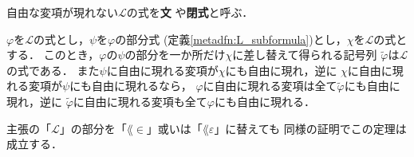 	\begin{screen}
		\begin{metadfn}[文]
			自由な変項が現れない$\mathcal{L}$の式を{\bf 文}
			や{\bf 閉式}と呼ぶ．
		\end{metadfn}
	\end{screen}
	
	\begin{screen}
		\begin{metathm}[部分式を取り替えても式]
		\label{metathm:replace_subformula_with_some_formula}
			$\varphi$を$\mathcal{L}$の式とし，$\psi$を$\varphi$の部分式
			(定義\ref{metadfn:L_subformula})とし，$\chi$を$\mathcal{L}$の式とする．
			このとき，$\varphi$の$\psi$の部分を一か所だけ$\chi$に差し替えて得られる記号列
			$\widetilde{\varphi}$は$\mathcal{L}$の式である．
			また$\psi$に自由に現れる変項が$\chi$にも自由に現れ，逆に
			$\chi$に自由に現れる変項が$\psi$にも自由に現れるなら，
			$\varphi$に自由に現れる変項は全て$\widetilde{\varphi}$にも自由に現れ，逆に
			$\widetilde{\varphi}$に自由に現れる変項も全て$\varphi$にも自由に現れる．
		\end{metathm}
	\end{screen}
	
	主張の「$\mathcal{L}$」の部分を「$\lang{\in}$」或いは「$\lang{\varepsilon}$」に替えても
	同様の証明でこの定理は成立する．
	
